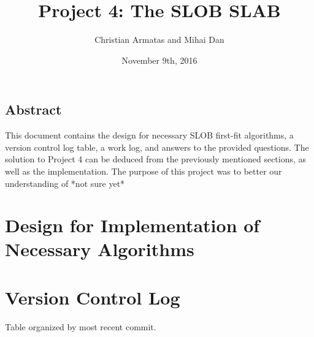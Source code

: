 \documentclass[letterpaper,10pt,onecolumn]{IEEEtran}
\title{Project 4: The SLOB SLAB}
\author{Christian Armatas and Mihai Dan}
\date{November 9th, 2016}
\begin{document}
    \begin{center}
        \begin{minipage}[h]{\textwidth}
            \maketitle
        \end{minipage}
    \end{center}
    
    \vspace{140mm}
    
    \begin{center}
        \section*{Abstract}
        This document contains the design for necessary SLOB first-fit algorithms, a version control log table, a work log, and answers to the provided questions. The solution to Project 4 can be deduced from the previously mentioned sections, as well as the implementation. The purpose of this project was to better our understanding of *not sure yet*
    \end{center}
    
    
    \newpage
    
    
    \section*{Design for Implementation of Necessary Algorithms}
    
  

    \vspace{6mm}
    
    
    \section*{Version Control Log}
        \begin{center}
            Table organized by most recent commit.
        \end{center}
        
        \vspace{0.5mm}
        
\end{document}
